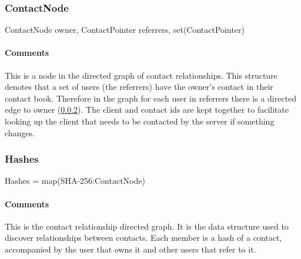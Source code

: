 \documentclass[a4paper,10pt]{article}
\begin{document}
\subsubsection{ContactNode}
\label{sec:structure:server:contact_node}

\begin{verbbox}
ContactNode
{
  owner, ContactPointer
  referrers, set(ContactPointer)
}
\end{verbbox}
\begin{center}
\theverbbox
\end{center}

\begin{inparaitem}[ ]
 \item \infrastructure
\end{inparaitem}

\paragraph*{Comments}
This is a node in the directed graph of contact relationships. This structure denotes that a set of users (the referrers) have the owner's contact in their contact book. Therefore 
in the graph for each user in referrers there is a directed edge to owner (\ref{sec:structure:server:hashes}). The client and contact ids are kept together to facilitate looking 
up the client that needs to be contacted by the server if something changes.

\subsubsection{Hashes}
\label{sec:structure:server:hashes}

\begin{verbbox}
Hashes = map(SHA-256:ContactNode)
\end{verbbox}
\begin{center}
\theverbbox
\end{center}

\begin{inparaitem}[ ]
 \item \unique
 \item \persistent
 \item \secure
\end{inparaitem}

\paragraph*{Comments}
This is the contact relationship directed graph. It is the data structure used to discover relationships between contacts. Each member is a hash of a contact, accompanied by the 
user that owns it and other users that refer to it.



\end{document}
